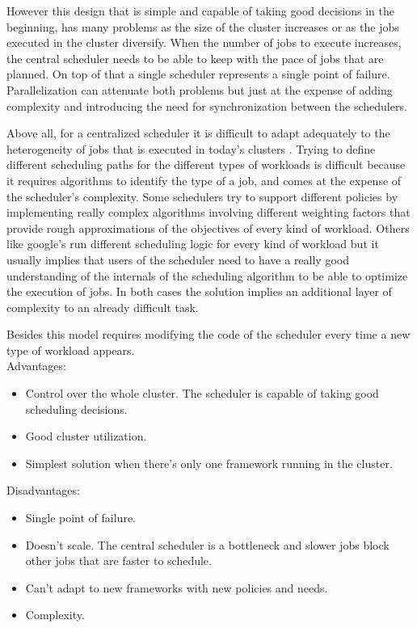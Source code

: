 \documentclass{article}                     %
\begin{document}
However this design that is simple and capable of taking good
decisions in the beginning, has many problems as the size of the
cluster increases or as the jobs executed in the cluster
diversify. When the number of jobs to execute increases, the central
scheduler needs to be able to keep with the pace of jobs that are
planned. On top of that a single scheduler represents a single point
of failure. Parallelization can attenuate both problems but just at the
expense of adding complexity and introducing the need for synchronization
between the schedulers.

Above all, for a centralized scheduler it is difficult to adapt
adequately to the heterogeneity of jobs that is executed in today's
clusters \cite{37201}. Trying to define different
scheduling paths for the different types of workloads is difficult
because it requires algorithms to identify the type of a job, and comes
at the expense of the scheduler's complexity. Some schedulers try to
support different policies by implementing really complex algorithms
involving different weighting factors that provide rough
approximations of the objectives of every kind of workload. Others
like google's run different scheduling logic for every kind of
workload but it usually implies that users of the scheduler need to
have a really good understanding of the internals of the scheduling
algorithm to be able to optimize the execution of jobs. In both cases
the solution implies an additional layer of complexity to an already
difficult task.

Besides this model requires modifying the code of the scheduler every
time a new type of workload appears.  \\

Advantages:

\begin{itemize}\itemsep4pt
  \item Control over the whole cluster. The scheduler is capable of taking good scheduling decisions.
  \item Good cluster utilization.
  \item Simplest solution when there's only one framework running in
    the cluster. \\
\end{itemize}

Disadvantages:

\begin{itemize}\itemsep4pt
  \item Single point of failure.
  \item Doesn't scale. The central scheduler is a bottleneck and
    slower jobs block other jobs that are faster to schedule.
  \item Can't adapt to new frameworks with new policies and needs.
  \item Complexity.
\end{itemize}
\end{document}
